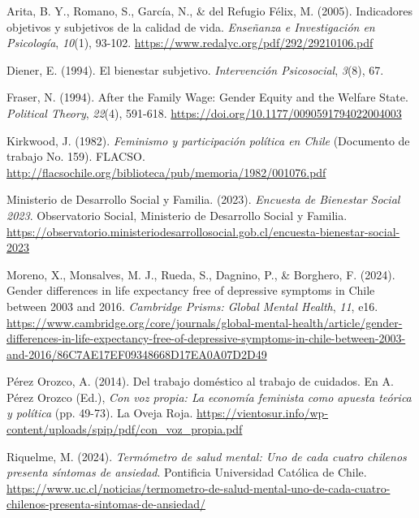 \documentclass[
  spanish,
  a4paper,
  oneside]{scrbook}
\newlength{\cslhangindent}
\newenvironment{CSLReferences}[2] %
 {\begin{list}{}{%
  \setlength{\itemindent}{0pt}
  \setlength{\leftmargin}{0pt}
  \setlength{\parsep}{0pt}
  \ifodd #1
   \setlength{\leftmargin}{\cslhangindent}
   \setlength{\itemindent}{-1\cslhangindent}
  \fi
  \setlength{\itemsep}{#2\baselineskip}}}
 {\end{list}}
\begin{document}
\protect{}\label{refs}
\begin{CSLReferences}{1}{0}
{Arita, B. Y., Romano, S., García, N., \& del Refugio Félix, M.} (2005).
Indicadores objetivos y subjetivos de la calidad de vida.
\emph{Enseñanza e Investigación en Psicología}, \emph{10}(1), 93-102.
\url{https://www.redalyc.org/pdf/292/29210106.pdf}

Diener, E. (1994). El bienestar subjetivo. \emph{Intervención
Psicosocial}, \emph{3}(8), 67.

Fraser, N. (1994). After the Family Wage: Gender Equity and the Welfare
State. \emph{Political Theory}, \emph{22}(4), 591-618.
\url{https://doi.org/10.1177/0090591794022004003}

Kirkwood, J. (1982). \emph{Feminismo y participación política en
{Chile}} (Documento de trabajo No. 159). FLACSO.
\url{http://flacsochile.org/biblioteca/pub/memoria/1982/001076.pdf}

Ministerio de Desarrollo Social y Familia. (2023). \emph{Encuesta de
Bienestar Social 2023}. Observatorio Social, Ministerio de Desarrollo
Social y Familia.
\url{https://observatorio.ministeriodesarrollosocial.gob.cl/encuesta-bienestar-social-2023}

Moreno, X., Monsalves, M. J., Rueda, S., Dagnino, P., \& Borghero, F.
(2024). Gender differences in life expectancy free of depressive
symptoms in {Chile} between 2003 and 2016. \emph{Cambridge Prisms:
Global Mental Health}, \emph{11}, e16.
\url{https://www.cambridge.org/core/journals/global-mental-health/article/gender-differences-in-life-expectancy-free-of-depressive-symptoms-in-chile-between-2003-and-2016/86C7AE17EF09348668D17EA0A07D2D49}

Pérez Orozco, A. (2014). Del trabajo doméstico al trabajo de cuidados.
En A. Pérez Orozco (Ed.), \emph{Con voz propia: La economía feminista
como apuesta teórica y política} (pp. 49-73). La Oveja Roja.
\url{https://vientosur.info/wp-content/uploads/spip/pdf/con_voz_propia.pdf}

Riquelme, M. (2024). \emph{Termómetro de salud mental: Uno de cada
cuatro chilenos presenta síntomas de ansiedad}. Pontificia Universidad
Católica de Chile.
\url{https://www.uc.cl/noticias/termometro-de-salud-mental-uno-de-cada-cuatro-chilenos-presenta-sintomas-de-ansiedad/}


\end{CSLReferences}
\end{document}
